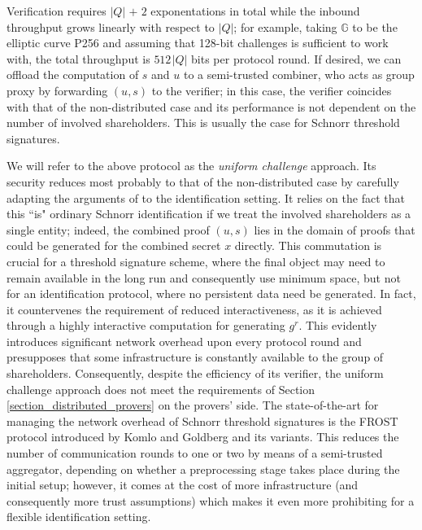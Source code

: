 \documentclass[psamsfonts, reqno]{amsart}
\theoremstyle{definition}
\theoremstyle{remark}
\numberwithin{equation}{section}
\begin{document}
Verification requires $|Q|\hspace{1pt} +\hspace{1pt} 2$
exponentations in total
while the inbound throughput grows linearly
with respect to $|Q|$; for example,
taking $\mathbb{G}$ to be the elliptic curve P256
and assuming that 128-bit challenges is sufficient to work with,
the total throughput is $512 \hspace{1pt} |Q|$ bits per protocol
round. If desired, we can offload the computation of $s$ and $u$
to a semi-trusted combiner,
who acts as group proxy by forwarding $(u, s)$ to the verifier;
in this case, the verifier coincides with that of the
non-distributed case and its performance
is not dependent on the number of involved shareholders.
This is usually the case for Schnorr threshold signatures.

We will refer to the above protocol as the
\textit{uniform challenge} approach.
Its security reduces most probably
to that of the non-distributed case
by carefully adapting the arguments of
\cite{paper_stinson_strobl} to the identification setting.
It relies on the fact that
this ``is" ordinary Schnorr identification if we treat the
involved shareholders as a single entity;
indeed, the combined proof $(u, s)$ lies in the domain
of proofs that could be generated
for the combined secret $x$ directly.
This commutation is crucial for
a threshold signature scheme,
where the final object may need to
remain available in the long run
and consequently use minimum space,
but not for an identification protocol,
where no persistent data need be generated.
In fact, it countervenes the requirement
of reduced interactiveness, as it is achieved through
a highly interactive computation
for generating $g^r$.
This evidently introduces significant
network overhead upon every protocol round and
presupposes that some infrastructure is constantly available
to the group of shareholders.
Consequently, despite the efficiency of its verifier,
the uniform challenge approach does not meet the requirements
of Section \ref{section_distributed_provers} on the provers' side.
The state-of-the-art for managing the network overhead
of Schnorr threshold signatures
is the FROST protocol introduced by Komlo and Goldberg \cite{paper_frost}
and its variants.
This reduces the number of communication rounds
to one or two by means of a semi-trusted aggregator,
depending on whether
a preprocessing stage takes place during the initial setup;
however, it comes at the cost of more
infrastructure (and consequently more trust assumptions)
which makes it even more
prohibiting for a flexible identification setting.
\end{document}
